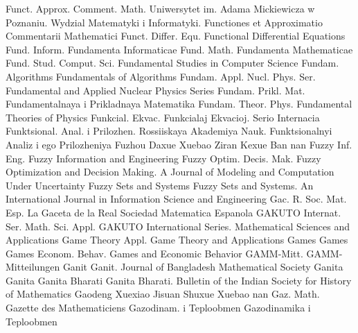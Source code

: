 {Funct. Approx. Comment. Math.}
{Uniwersytet im. Adama Mickiewicza w Poznaniu. Wydzial Matematyki i Informatyki. Functiones et Approximatio Commentarii Mathematici}
{Funct. Differ. Equ.}
{Functional Differential Equations}
{Fund. Inform.}
{Fundamenta Informaticae}
{Fund. Math.}
{Fundamenta Mathematicae}
{Fund. Stud. Comput. Sci.}
{Fundamental Studies in Computer Science}
{Fundam. Algorithms}
{Fundamentals of Algorithms}
{Fundam. Appl. Nucl. Phys. Ser.}
{Fundamental and Applied Nuclear Physics Series}
{Fundam. Prikl. Mat.}
{Fundamentalnaya i Prikladnaya Matematika}
{Fundam. Theor. Phys.}
{Fundamental Theories of Physics}
{Funkcial. Ekvac.}
{Funkcialaj Ekvacioj. Serio Internacia}
{Funktsional. Anal. i Prilozhen.}
{Rossiiskaya Akademiya Nauk. Funktsionalnyi Analiz i ego Prilozheniya}
{Fuzhou Daxue Xuebao Ziran Kexue Ban}
{nan}
{Fuzzy Inf. Eng.}
{Fuzzy Information and Engineering}
{Fuzzy Optim. Decis. Mak.}
{Fuzzy Optimization and Decision Making. A Journal of Modeling and Computation Under Uncertainty}
{Fuzzy Sets and Systems}
{Fuzzy Sets and Systems. An International Journal in Information Science and Engineering}
{Gac. R. Soc. Mat. Esp.}
{La Gaceta de la Real Sociedad Matematica Espanola}
{GAKUTO Internat. Ser. Math. Sci. Appl.}
{GAKUTO International Series. Mathematical Sciences and Applications}
{Game Theory Appl.}
{Game Theory and Applications}
{Games}
{Games}
{Games Econom. Behav.}
{Games and Economic Behavior}
{GAMM-Mitt.}
{GAMM-Mitteilungen}
{Ganit}
{Ganit. Journal of Bangladesh Mathematical Society}
{Ganita}
{Ganita}
{Ganita Bharati}
{Ganita Bharati. Bulletin of the Indian Society for History of Mathematics}
{Gaodeng Xuexiao Jisuan Shuxue Xuebao}
{nan}
{Gaz. Math.}
{Gazette des Mathematiciens}
{Gazodinam. i Teploobmen}
{Gazodinamika i Teploobmen}
